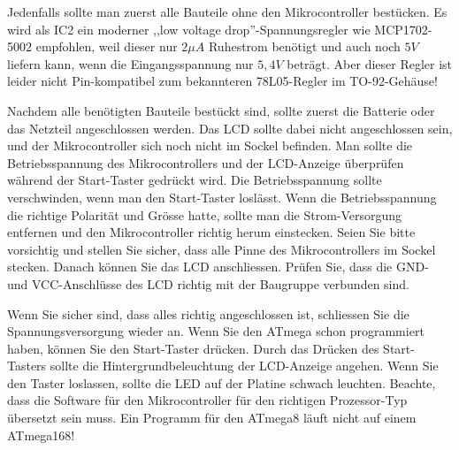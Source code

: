 Jedenfalls sollte man zuerst alle Bauteile ohne den Mikrocontroller bestücken.
Es wird als IC2 ein moderner ,,low voltage drop''-Spannungsregler wie MCP1702-5002 empfohlen, weil
dieser nur \(2\mu A\) Ruhestrom benötigt und auch noch \(5V\) liefern kann, 
 wenn die Eingangsspannung nur \(5,4V\) beträgt.
Aber dieser Regler ist leider nicht Pin-kompatibel zum bekannteren 78L05-Regler im TO-92-Gehäuse!

Nachdem alle benötigten Bauteile bestückt sind, sollte zuerst die Batterie
oder das Netzteil angeschlossen werden. Das LCD sollte dabei nicht angeschlossen sein, und der Mikrocontroller sich noch nicht im Sockel befinden.
Man sollte die Betriebsspannung des Mikrocontrollers und der LCD-Anzeige
überprüfen während der Start-Taster gedrückt wird.
Die Betriebsspannung sollte verschwinden, wenn man den Start-Taster loslässt.
Wenn die Betriebsspannung die richtige Polarität und Grösse hatte,
sollte man die Strom-Versorgung entfernen und den Mikrocontroller 
richtig herum einstecken. Seien Sie bitte vorsichtig und stellen Sie sicher,
dass alle Pinne des Mikrocontrollers im Sockel stecken.
Danach können Sie das LCD anschliessen. Prüfen Sie, dass die GND- und VCC-Anschlüsse des LCD richtig mit der Baugruppe verbunden sind.

Wenn Sie sicher sind, dass alles richtig angeschlossen ist, schliessen Sie
die Spannungsversorgung wieder an.
Wenn Sie den ATmega schon programmiert haben, können Sie den Start-Taster
drücken.
Durch das Drücken des Start-Tasters sollte die Hintergrundbeleuchtung
der LCD-Anzeige angehen.
Wenn Sie den Taster loslassen, sollte die LED auf der Platine schwach leuchten.
Beachte, dass die Software für den Mikrocontroller für den richtigen
Prozessor-Typ übersetzt sein muss. Ein Programm für den ATmega8 läuft
nicht auf einem ATmega168!


